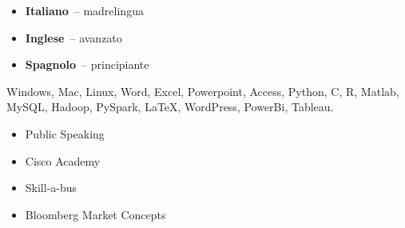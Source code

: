 \begin{minipage}[t]{0.33\textwidth}
{\begin{minipage}[t][293mm][t]{0.82\textwidth}
	\begin{itemize}
		\item \textbf{Italiano}~-- madrelingua \\
		\item \textbf{Inglese}~-- avanzato \\
		\item \textbf{Spagnolo}~-- principiante \\
	\end{itemize} 

	Windows, Mac, Linux, Word, Excel, Powerpoint, Access, 
	Python, C, R, Matlab, MySQL, Hadoop, PySpark, LaTeX, WordPress, 
	PowerBi, Tableau.

	\begin{itemize}
		\item Public Speaking
		\item Cisco Academy
		\item Skill-a-bus
		\item Bloomberg Market Concepts
	\end{itemize}

	\end{minipage}%
	\textwidth\relax
} 									%
\end{minipage} 						%